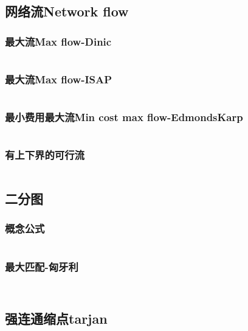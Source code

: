 \documentclass[twoside,sub3section,UTF8]{ctexart}						%
\begin{document}
	\subsection{网络流Network flow}
		\subsubsection{最大流Max flow-Dinic}
		\inputminted{c++}{Gragh Theory/Network Flow/dinic.cpp}
		\subsubsection{最大流Max flow-ISAP}
		\inputminted{c++}{Gragh Theory/Network Flow/ISAP.cpp}
		\subsubsection{最小费用最大流Min cost max flow-EdmondsKarp}
		\inputminted{c++}{Gragh Theory/Network Flow/MCMF.cpp}
		\subsubsection{有上下界的可行流}
		\inputminted{c++}{Gragh Theory/Network Flow/lowup.cpp}

	\subsection{二分图}
		\subsubsection{概念公式}
		\inputminted{c++}{Gragh Theory/Bipartite gragh/emmm.cpp}
		\subsubsection{最大匹配-匈牙利}
		\inputminted{c++}{Gragh Theory/Bipartite gragh/hungary.cpp}
		\inputminted{c++}{Gragh Theory/Bipartite gragh/hungarymatrix.cpp}

	\subsection{强连通缩点tarjan}
	\inputminted{c++}{Gragh Theory/SCC.cpp}
\end{document}
